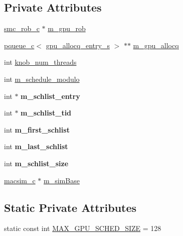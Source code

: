 \subsection*{Private Attributes}
\begin{DoxyCompactItemize}
\item 
\hyperlink{classsmc__rob__c}{smc\_\-rob\_\-c} $\ast$ \hyperlink{classschedule__smc__c_a9010fc8b51522f02c9742f7c9498805b}{m\_\-gpu\_\-rob}
\item 
\hyperlink{classpqueue__c}{pqueue\_\-c}$<$ \hyperlink{structgpu__allocq__entry__s}{gpu\_\-allocq\_\-entry\_\-s} $>$ $\ast$$\ast$ \hyperlink{classschedule__smc__c_a8862c810b1e0da537ef0a5b7b7e8e2b6}{m\_\-gpu\_\-allocq}
\item 
int \hyperlink{classschedule__smc__c_a615d15485be9b13e8f62ed984acc588e}{knob\_\-num\_\-threads}
\item 
int \hyperlink{classschedule__smc__c_aeb0d028cbba234e9e93abede46bba2ca}{m\_\-schedule\_\-modulo}
\item 
\hypertarget{classschedule__smc__c_a7a1cd319f4e01bc323443722b77fbc24}{
int $\ast$ {\bfseries m\_\-schlist\_\-entry}}
\label{classschedule__smc__c_a7a1cd319f4e01bc323443722b77fbc24}

\item 
\hypertarget{classschedule__smc__c_a33117e5fec2a6e9b62f028c04186bbf5}{
int $\ast$ {\bfseries m\_\-schlist\_\-tid}}
\label{classschedule__smc__c_a33117e5fec2a6e9b62f028c04186bbf5}

\item 
\hypertarget{classschedule__smc__c_aacd48030e596766416ed7ac22fcfb9fb}{
int {\bfseries m\_\-first\_\-schlist}}
\label{classschedule__smc__c_aacd48030e596766416ed7ac22fcfb9fb}

\item 
\hypertarget{classschedule__smc__c_a00ae6f68a0eec8a62ed44381329ee6b8}{
int {\bfseries m\_\-last\_\-schlist}}
\label{classschedule__smc__c_a00ae6f68a0eec8a62ed44381329ee6b8}

\item 
\hypertarget{classschedule__smc__c_a60aa9c8f3eea2e35f0298320fd4d0783}{
int {\bfseries m\_\-schlist\_\-size}}
\label{classschedule__smc__c_a60aa9c8f3eea2e35f0298320fd4d0783}

\item 
\hyperlink{classmacsim__c}{macsim\_\-c} $\ast$ \hyperlink{classschedule__smc__c_a40d5c66331f8f72123691ebbb4590f3b}{m\_\-simBase}
\end{DoxyCompactItemize}
\subsection*{Static Private Attributes}
\begin{DoxyCompactItemize}
\item 
static const int \hyperlink{classschedule__smc__c_a70bea811c0a494c3741fa64b319b0001}{MAX\_\-GPU\_\-SCHED\_\-SIZE} = 128
\end{DoxyCompactItemize}


